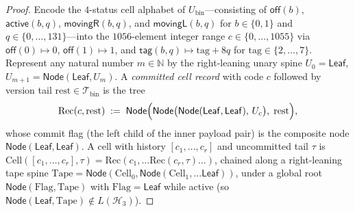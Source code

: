 \documentclass[11pt,reqno]{amsart}
\numberwithin{equation}{section}
\theoremstyle{plain}
\theoremstyle{definition}
\theoremstyle{remark}
\newcommand{\Tbin}{\mathcal{T}_{\mathrm{bin}}}
\begin{document}
\begin{proof}
Encode the $4$-status cell alphabet of $U_{\mathrm{bin}}$---consisting of $\mathsf{off}(b)$, $\mathsf{active}(b, q)$, $\mathsf{movingR}(b, q)$, and $\mathsf{movingL}(b, q)$ for $b \in \{0,1\}$ and $q \in \{0,\dots,131\}$---into the $1056$-element integer range $c \in \{0,\dots,1055\}$ via $\mathsf{off}(0) \mapsto 0$, $\mathsf{off}(1) \mapsto 1$, and $\mathsf{tag}(b,q) \mapsto \mathrm{tag} + 8q$ for $\mathrm{tag} \in \{2,\dots,7\}$. Represent any natural number $m \in \mathbb{N}$ by the right-leaning unary spine $U_0 = \mathsf{Leaf}$, $U_{m+1} = \mathsf{Node}(\mathsf{Leaf}, U_m)$. A \emph{committed cell record} with code $c$ followed by version tail $\mathrm{rest} \in \Tbin$ is the tree
\[
  \mathrm{Rec}(c, \mathrm{rest}) \;:=\; \mathsf{Node}\Bigl(\mathsf{Node}\bigl(\mathsf{Node}(\mathsf{Leaf},\mathsf{Leaf}),\, U_c\bigr),\; \mathrm{rest}\Bigr),
\]
whose commit flag (the left child of the inner payload pair) is the composite node $\mathsf{Node}(\mathsf{Leaf},\mathsf{Leaf})$. A cell with history $[c_1, \dots, c_r]$ and uncommitted tail $\tau$ is $\mathrm{Cell}([c_1,\dots,c_r], \tau) = \mathrm{Rec}(c_1, \dots \mathrm{Rec}(c_r, \tau)\dots)$, chained along a right-leaning tape spine $\mathrm{Tape} = \mathsf{Node}(\mathrm{Cell}_0, \mathsf{Node}(\mathrm{Cell}_1, \dots \mathsf{Leaf}))$, under a global root $\mathsf{Node}(\mathrm{Flag}, \mathrm{Tape})$ with $\mathrm{Flag} = \mathsf{Leaf}$ while active (so $\mathsf{Node}(\mathsf{Leaf}, \mathrm{Tape}) \notin L(\mathcal{H}_3)$).


\end{proof}
\end{document}
